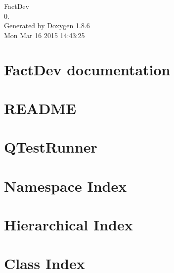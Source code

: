 \documentclass[twoside]{book}
\newcommand{\clearemptydoublepage}{%
  \newpage{\pagestyle{empty}\cleardoublepage}%
}
\begin{document}
\hypersetup{pageanchor=false}
\begin{titlepage}
\vspace*{7cm}
\begin{center}%
{\Large Fact\-Dev \\[1ex]\large 0. }\\
\vspace*{1cm}
{\large Generated by Doxygen 1.8.6}\\
\vspace*{0.5cm}
{\small Mon Mar 16 2015 14:43:25}\\
\end{center}
\end{titlepage}
\clearemptydoublepage
\tableofcontents
\clearemptydoublepage
{}
\hypersetup{pageanchor=true}

\chapter{Fact\-Dev documentation}
\label{index}\hypertarget{index}{}
\chapter{R\-E\-A\-D\-M\-E}
\label{da/d07/md__home_travis_build_FACT-Team_FactDev_src_libs_qt-mustache_README}
\hypertarget{da/d07/md__home_travis_build_FACT-Team_FactDev_src_libs_qt-mustache_README}{}

\chapter{Q\-Test\-Runner}
\label{d7/d95/md__home_travis_build_FACT-Team_FactDev_tests_QTestRunner_README}
\hypertarget{d7/d95/md__home_travis_build_FACT-Team_FactDev_tests_QTestRunner_README}{}

\chapter{Namespace Index}

\chapter{Hierarchical Index}

\chapter{Class Index}

\end{document}
